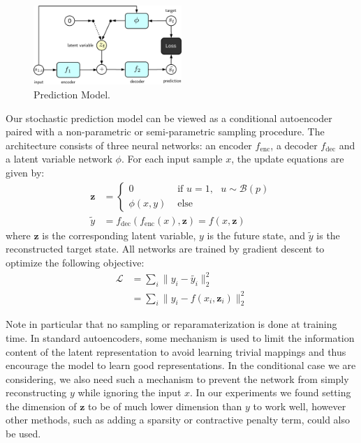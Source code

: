 \documentclass{article}
\begin{document}
\begin{figure}
  \centering
  \includegraphics[width=0.5\textwidth]{images/ae_train-crop.pdf}
  \caption{Prediction Model. }
\end{figure}

Our stochastic prediction model can be viewed as a conditional autoencoder paired with a non-parametric  or semi-parametric sampling procedure.
The architecture consists of three neural networks: an encoder $f_\text{enc}$, a decoder $f_\text{dec}$ and a latent variable network $\phi$.
For each input sample $x$, the update equations are given by:
%
\begin{align*}
  \bm{z} &=
  \begin{cases}
    0 & \mbox{   if   } u = 1, \mbox{   } u \sim \mathcal{B}(p) \\
    \phi(x, y) & \mbox{   else }
  \end{cases} \\
  \tilde{y} &= f_\text{dec}(f_\text{enc}(x), \bm{z}) = f(x, \bm{z})
\end{align*}
%
where $\bm{z}$ is the corresponding latent variable, $y$ is the future state, and $\tilde{y}$ is the reconstructed target state.
All networks are trained by gradient descent to optimize the following objective:
%
\begin{align}
  \mathcal{L} &= \sum_i \|y_i - \tilde{y_i} \|_2^2 \\
  &= \sum_i \|y_i - f(x_i, \bm{z}_i) \|_2^2
\end{align}

Note in particular that no sampling or reparamaterization is done at training time.
In standard autoencoders, some mechanism is used to limit the information content of the latent representation to avoid learning trivial mappings and thus encourage the model to learn good representations.
In the conditional case we are considering, we also need such a mechanism to prevent the network from simply reconstructing $y$ while ignoring the input $x$.
In our experiments we found setting the dimension of $\bm{z}$ to be of much lower dimension than $y$ to work well, however other methods, such as adding a sparsity or contractive penalty term, could also be used.
\end{document}

